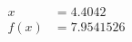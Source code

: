 \documentclass[preview]{standalone}
\begin{document}
\begin{align*}
x &= 4.4042\\f(x) &= 7.9541526
\end{align*}
\end{document}
